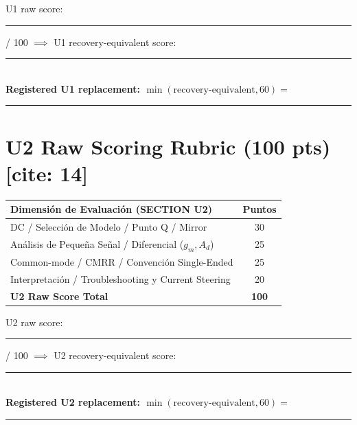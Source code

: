 \documentclass[11pt, a4paper]{article}
\begin{document}
\vspace{0.3cm}
\begin{tcolorbox}[colback=white, colframe=black, arc=0mm, title=\textbf{Decisión de Reemplazo U1[cite: 14]}]
    U1 raw score: \rule{2cm}{0.15mm} / 100 \quad $\implies$ U1 recovery-equivalent score: \rule{2cm}{0.15mm} \\
    \textbf{Registered U1 replacement: $\min(\text{recovery-equivalent}, 60) = $} \rule{2cm}{0.15mm}
\end{tcolorbox}

\section*{U2 Raw Scoring Rubric (100 pts)[cite: 14]}
\begin{tabularx}{\textwidth}{|>{\raggedright\arraybackslash}X|c|}
\hline
\rowcolor{ucbblue!20}
\textbf{Dimensión de Evaluación (SECTION U2)} & \textbf{Puntos} \\ \hline
DC / Selección de Modelo / Punto Q / Mirror & 30 \\ \hline
Análisis de Pequeña Señal / Diferencial ($g_m, A_d$) & 25 \\ \hline
Common-mode / CMRR / Convención Single-Ended & 25 \\ \hline
Interpretación / Troubleshooting y Current Steering & 20 \\ \hline
\rowcolor{gray!10}
\textbf{U2 Raw Score Total} & \textbf{100} \\ \hline
\end{tabularx}

\vspace{0.3cm}
\begin{tcolorbox}[colback=white, colframe=black, arc=0mm, title=\textbf{Decisión de Reemplazo U2[cite: 14]}]
    U2 raw score: \rule{2cm}{0.15mm} / 100 \quad $\implies$ U2 recovery-equivalent score: \rule{2cm}{0.15mm} \\
    \textbf{Registered U2 replacement: $\min(\text{recovery-equivalent}, 60) = $} \rule{2cm}{0.15mm}
\end{tcolorbox}
\end{document}
